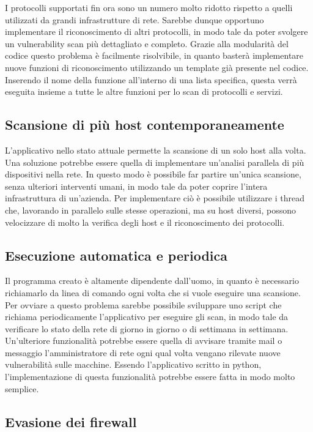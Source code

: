 \documentclass[12pt]{report}
\begin{document}
I protocolli supportati fin ora sono un numero molto ridotto rispetto a quelli utilizzati da grandi infrastrutture di rete. Sarebbe dunque opportuno implementare il riconoscimento di altri protocolli, in modo tale da poter svolgere un vulnerability scan più dettagliato e completo. Grazie alla modularità del codice questo problema è facilmente risolvibile, in quanto basterà implementare nuove funzioni di riconoscimento utilizzando un template già presente nel codice. Inserendo il nome della funzione all'interno di una lista specifica, questa verrà eseguita insieme a tutte le altre funzioni per lo scan di protocolli e servizi.

\subsection{Scansione di più host contemporaneamente}

L'applicativo nello stato attuale permette la scansione di un solo host alla volta. Una soluzione potrebbe essere quella di implementare un'analisi parallela di più dispositivi nella rete. In questo modo è possibile far partire un'unica scansione, senza ulteriori interventi umani, in modo tale da poter coprire l'intera infrastruttura di un'azienda. Per implementare ciò è possibile utilizzare i thread che, lavorando in parallelo sulle stesse operazioni, ma su host diversi, possono velocizzare di molto la verifica degli host e il riconoscimento dei protocolli.

\subsection{Esecuzione automatica e periodica}

Il programma creato è altamente dipendente dall'uomo, in quanto è necessario richiamarlo da linea di comando ogni volta che si vuole eseguire una scansione. Per ovviare a questo problema sarebbe possibile 
sviluppare uno script che richiama periodicamente l'applicativo per eseguire gli scan, in modo tale da verificare lo stato della rete di giorno in giorno o di settimana in settimana. Un'ulteriore funzionalità potrebbe essere quella di avvisare tramite mail o messaggio l'amministratore di rete ogni qual volta vengano rilevate nuove vulnerabilità sulle macchine. Essendo l'applicativo scritto in python, l'implementazione di questa funzionalità potrebbe essere fatta in modo molto semplice. 

\subsection{Evasione dei firewall}
\end{document}
